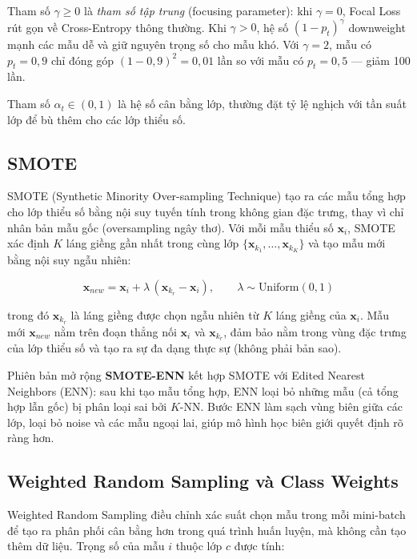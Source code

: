 \documentclass[../DoAn.tex]{subfiles}
\begin{document}
Tham số $\gamma \geq 0$ là \textit{tham số tập trung} (focusing parameter): khi $\gamma = 0$, Focal Loss rút gọn về Cross-Entropy thông thường. Khi $\gamma > 0$, hệ số $(1 - p_t)^\gamma$ downweight mạnh các mẫu dễ và giữ nguyên trọng số cho mẫu khó. Với $\gamma = 2$, mẫu có $p_t = 0{,}9$ chỉ đóng góp $(1-0{,}9)^2 = 0{,}01$ lần so với mẫu có $p_t = 0{,}5$ --- giảm 100 lần.

Tham số $\alpha_t \in (0, 1)$ là hệ số cân bằng lớp, thường đặt tỷ lệ nghịch với tần suất lớp để bù thêm cho các lớp thiểu số.

\subsection{SMOTE}
\label{subsec:smote}

SMOTE (Synthetic Minority Over-sampling Technique) \cite{chawla2002} tạo ra các mẫu tổng hợp cho lớp thiểu số bằng nội suy tuyến tính trong không gian đặc trưng, thay vì chỉ nhân bản mẫu gốc (oversampling ngây thơ). Với mỗi mẫu thiểu số $\mathbf{x}_i$, SMOTE xác định $K$ láng giềng gần nhất trong cùng lớp $\{\mathbf{x}_{k_1}, \ldots, \mathbf{x}_{k_K}\}$ và tạo mẫu mới bằng nội suy ngẫu nhiên:

\begin{equation}
    \mathbf{x}_{new} = \mathbf{x}_i + \lambda\, (\mathbf{x}_{k_r} - \mathbf{x}_i), \qquad \lambda \sim \text{Uniform}(0, 1)
    \label{eq:smote}
\end{equation}

trong đó $\mathbf{x}_{k_r}$ là láng giềng được chọn ngẫu nhiên từ $K$ láng giềng của $\mathbf{x}_i$. Mẫu mới $\mathbf{x}_{new}$ nằm trên đoạn thẳng nối $\mathbf{x}_i$ và $\mathbf{x}_{k_r}$, đảm bảo nằm trong vùng đặc trưng của lớp thiểu số và tạo ra sự đa dạng thực sự (không phải bản sao).

Phiên bản mở rộng \textbf{SMOTE-ENN} kết hợp SMOTE với Edited Nearest Neighbors (ENN): sau khi tạo mẫu tổng hợp, ENN loại bỏ những mẫu (cả tổng hợp lẫn gốc) bị phân loại sai bởi $K$-NN. Bước ENN làm sạch vùng biên giữa các lớp, loại bỏ noise và các mẫu ngoại lai, giúp mô hình học biên giới quyết định rõ ràng hơn.

\subsection{Weighted Random Sampling và Class Weights}
\label{subsec:weighted-sampling}

Weighted Random Sampling điều chỉnh xác suất chọn mẫu trong mỗi mini-batch để tạo ra phân phối cân bằng hơn trong quá trình huấn luyện, mà không cần tạo thêm dữ liệu. Trọng số của mẫu $i$ thuộc lớp $c$ được tính:
\end{document}
